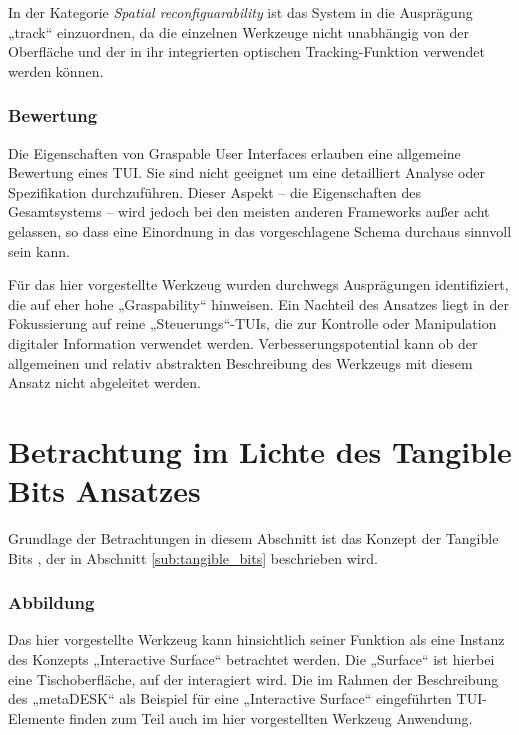 In der Kategorie \emph{Spatial reconfiguarability} ist das System in die Ausprägung „track“ einzuordnen, da die einzelnen Werkzeuge nicht unabhängig von der Oberfläche und der in ihr integrierten optischen Tracking-Funktion verwendet werden können.

\subsubsection{Bewertung}

Die Eigenschaften von Graspable User Interfaces erlauben eine allgemeine Bewertung eines \gls{TUI}. Sie sind nicht geeignet um eine detailliert Analyse oder Spezifikation durchzuführen. Dieser Aspekt -- die Eigenschaften des Gesamtsystems -- wird jedoch bei den meisten anderen Frameworks außer acht gelassen, so dass eine Einordnung in das vorgeschlagene Schema durchaus sinnvoll sein kann.

Für das hier vorgestellte Werkzeug wurden durchwegs Ausprägungen identifiziert, die auf eher hohe „Graspability“ hinweisen. Ein Nachteil des Ansatzes liegt in der Fokussierung auf reine „Steuerungs“-\glspl{TUI}, die zur Kontrolle oder Manipulation digitaler Information verwendet werden. Verbesserungspotential kann ob der allgemeinen und relativ abstrakten Beschreibung des Werkzeugs mit diesem Ansatz nicht abgeleitet werden.


\section{Betrachtung im Lichte des Tangible Bits Ansatzes} %
\label{sec:betrachtung_tangible_bits}

Grundlage der Betrachtungen in diesem Abschnitt ist das Konzept der Tangible Bits \citep{Ishii97}, der in Abschnitt \ref{sub:tangible_bits} beschrieben wird.

\subsubsection{Abbildung} 

Das hier vorgestellte Werkzeug kann hinsichtlich seiner Funktion als eine Instanz des Konzepts „Interactive Surface“ betrachtet werden. Die „Surface“ ist hierbei eine Tischoberfläche, auf der interagiert wird. Die im Rahmen der Beschreibung des „metaDESK“ \citep{Ullmer97} als Beispiel für eine „Interactive Surface“ eingeführten \gls{TUI}-Elemente finden zum Teil auch im hier vorgestellten Werkzeug Anwendung.

